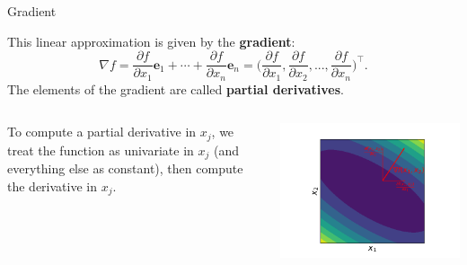 \begin{vbframe}{Gradient}

This linear approximation is given by the \textbf{gradient}: %
\vspace*{-0.3cm}
$$
\nabla f = \frac{\partial f}{\partial x_1} \bm e_1 + \cdots + \frac{\partial f}{\partial x_n} \bm e_n =
  \biggl(\frac{\partial f}{\partial x_1}, \frac{\partial f}{\partial x_2}, ..., \frac{\partial f}{\partial x_n}\biggr)^{\top}.
$$
The elements of the gradient are called \textbf{partial derivatives}. 

\vspace*{0.3cm}

\begin{columns}
\begin{column}{0.6\textwidth}
\vspace{1cm} \quad 

To compute a partial derivative in $x_j$, we treat the function as univariate in $x_j$ (and everything else as constant), then compute the derivative in $x_j$.
\end{column}
\begin{column}{0.4\textwidth}
\vspace{\topsep}
\includegraphics[width=\columnwidth,trim={2.5cm 0cm 2.0cm 0cm},clip]{figure_man/grad_unit_vectors.png} \\
\end{column}
\end{columns}



\end{vbframe}
